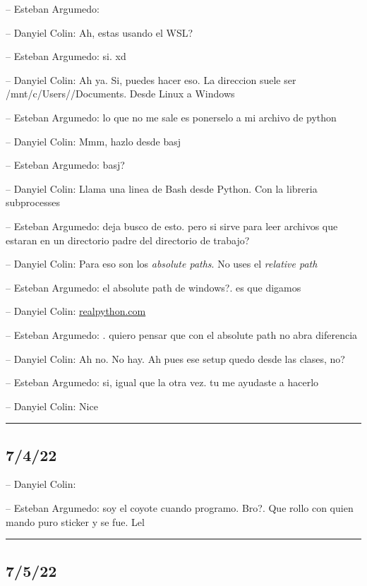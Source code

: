 -- Esteban Argumedo:

-- Danyiel Colin: Ah, estas usando el WSL?

-- Esteban Argumedo: si. xd

-- Danyiel Colin: Ah ya. Si, puedes hacer eso. La direccion suele ser
/mnt/c/Users//Documents. Desde Linux a Windows

-- Esteban Argumedo: lo que no me sale es ponerselo a mi archivo de
python

-- Danyiel Colin: Mmm, hazlo desde basj

-- Esteban Argumedo: basj?

-- Danyiel Colin: Llama una linea de Bash desde Python. Con la libreria
subprocesses

-- Esteban Argumedo: deja busco de esto. pero si sirve para leer
archivos que estaran en un directorio padre del directorio de trabajo?

-- Danyiel Colin: Para eso son los \emph{absolute paths}. No uses el
\emph{relative path}

-- Esteban Argumedo: el absolute path de windows?. es que digamos

-- Danyiel Colin:
\href{https://realpython.com/python-subprocess/\#processes-and-subprocesses}{realpython.com}

-- Esteban Argumedo: . quiero pensar que con el absolute path no abra
diferencia

-- Danyiel Colin: Ah no. No hay. Ah pues ese setup quedo desde las
clases, no?

-- Esteban Argumedo: si, igual que la otra vez. tu me ayudaste a hacerlo

-- Danyiel Colin: Nice

\begin{center}\rule{0.5\linewidth}{0.5pt}\end{center}

\hypertarget{section-116}{%
\subsection{7/4/22}\label{section-116}}

-- Danyiel Colin:

-- Esteban Argumedo: soy el coyote cuando programo. Bro?. Que rollo con
quien mando puro sticker y se fue. Lel

\begin{center}\rule{0.5\linewidth}{0.5pt}\end{center}

\hypertarget{section-117}{%
\subsection{7/5/22}\label{section-117}}

